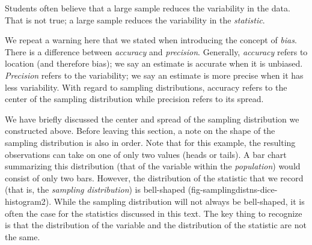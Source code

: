 \documentclass[
  letterpaper,
  DIV=11,
  numbers=noendperiod]{scrreprt}
\theoremstyle{plain}
\theoremstyle{definition}
\theoremstyle{definition}
\theoremstyle{remark}
\begin{document}
\begin{tcolorbox}[enhanced jigsaw, breakable, titlerule=0mm, colframe=quarto-callout-note-color-frame, bottomtitle=1mm, opacityback=0, rightrule=.15mm, toptitle=1mm, arc=.35mm, bottomrule=.15mm, left=2mm, title=\textcolor{quarto-callout-note-color}{\faInfo}\hspace{0.5em}{Note}, leftrule=.75mm, coltitle=black, toprule=.15mm, colbacktitle=quarto-callout-note-color!10!white, colback=white, opacitybacktitle=0.6]

Students often believe that a large sample reduces the variability in
the data. That is not true; a large sample reduces the variability in
the \emph{statistic}.

\end{tcolorbox}

\begin{tcolorbox}[enhanced jigsaw, breakable, titlerule=0mm, colframe=quarto-callout-warning-color-frame, bottomtitle=1mm, opacityback=0, rightrule=.15mm, toptitle=1mm, arc=.35mm, bottomrule=.15mm, left=2mm, title=\textcolor{quarto-callout-warning-color}{\faExclamationTriangle}\hspace{0.5em}{Warning}, leftrule=.75mm, coltitle=black, toprule=.15mm, colbacktitle=quarto-callout-warning-color!10!white, colback=white, opacitybacktitle=0.6]

We repeat a warning here that we stated when introducing the concept of
\emph{bias}. There is a difference between \emph{accuracy} and
\emph{precision}. Generally, \emph{accuracy} refers to location (and
therefore bias); we say an estimate is accurate when it is unbiased.
\emph{Precision} refers to the variability; we say an estimate is more
precise when it has less variability. With regard to sampling
distributions, accuracy refers to the center of the sampling
distribution while precision refers to its spread.

\end{tcolorbox}

We have briefly discussed the center and spread of the sampling
distribution we constructed above. Before leaving this section, a note
on the shape of the sampling distribution is also in order. Note that
for this example, the resulting observations can take on one of only two
values (heads or tails). A bar chart summarizing this distribution (that
of the variable within the \emph{population}) would consist of only two
bars. However, the distribution of the statistic that we record (that
is, the \emph{sampling distribution}) is bell-shaped
(fig-samplingdistns-dice-histogram2). While the sampling distribution
will not always be bell-shaped, it is often the case for the statistics
discussed in this text. The key thing to recognize is that the
distribution of the variable and the distribution of the statistic are
not the same.
\end{document}
